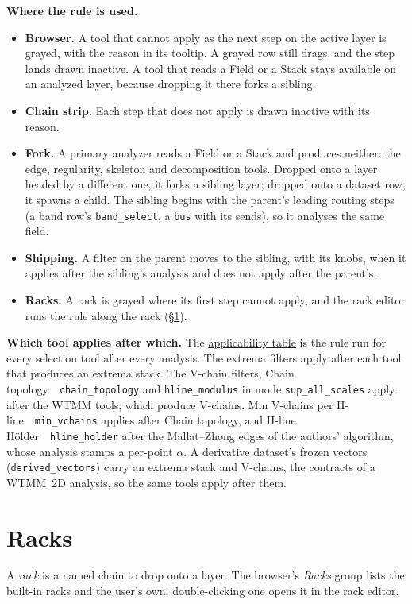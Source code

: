 \documentclass[10pt]{article}
\newcommand{\dev}[1]{\texttt{#1}}
\newcommand{\tool}[2]{#1~\textperiodcentered~\dev{#2}}
\begin{document}
\textbf{Where the rule is used.}
\begin{itemize}\itemsep2pt
  \item \textbf{Browser.} A tool that cannot apply as the next step on the active layer is
        grayed, with the reason in its tooltip. A grayed row still drags, and the step lands
        drawn inactive. A tool that reads a Field or a Stack stays available on an analyzed
        layer, because dropping it there forks a sibling.
  \item \textbf{Chain strip.} Each step that does not apply is drawn inactive with its reason.
  \item \textbf{Fork.} A primary analyzer reads a Field or a Stack and produces neither: the
        edge, regularity, skeleton and decomposition tools. Dropped onto a layer headed by a
        different one, it forks a sibling layer; dropped onto a dataset row, it spawns a child.
        The sibling begins with the parent's leading routing steps (a band row's
        \dev{band\_select}, a \dev{bus} with its sends), so it analyses the same field.
  \item \textbf{Shipping.} A filter on the parent moves to the sibling, with its knobs, when it
        applies after the sibling's analysis and does not apply after the parent's.
  \item \textbf{Racks.} A rack is grayed where its first step cannot apply, and the rack editor
        runs the rule along the rack (\S\ref{sec:racks}).
\end{itemize}

\textbf{Which tool applies after which.} The \hyperref[tab:applicability]{applicability
table} is the rule run for every selection tool after every analysis. The extrema filters
apply after each tool that produces an extrema stack. The V-chain filters,
\tool{Chain topology}{chain\_topology} and \dev{hline\_modulus} in mode
\texttt{sup\_all\_scales} apply after the WTMM tools, which produce V-chains.
\tool{Min V-chains per H-line}{min\_vchains} applies after Chain topology, and
\tool{H-line H\"older}{hline\_holder} after the Mallat--Zhong edges of the authors' algorithm,
whose analysis stamps a per-point $\alpha$. A derivative dataset's frozen vectors
(\dev{derived\_vectors}) carry an extrema stack and V-chains, the contracts of a WTMM~2D
analysis, so the same tools apply after them.



\section{Racks}\label{sec:racks}
A \emph{rack} is a named chain to drop onto a layer. The browser's \emph{Racks} group lists the
built-in racks and the user's own; double-clicking one opens it in the rack editor.
\end{document}
